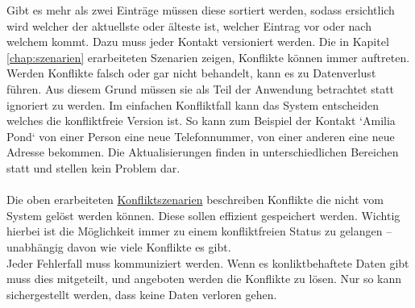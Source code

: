 Gibt es mehr als zwei Einträge müssen diese sortiert werden, sodass ersichtlich wird welcher der aktuellste oder älteste ist, welcher Eintrag vor oder nach welchem kommt. Dazu muss jeder Kontakt versioniert werden.
%
%
Die in Kapitel \ref{chap:szenarien} erarbeiteten Szenarien zeigen, Konflikte können immer auftreten. Werden Konflikte falsch oder gar nicht behandelt, kann es zu Datenverlust führen.
Aus diesem Grund müssen sie als Teil der Anwendung betrachtet statt ignoriert zu werden.
Im einfachen Konfliktfall kann das System entscheiden welches die konfliktfreie Version ist. So kann zum Beispiel der Kontakt `Amilia Pond` von einer Person eine neue Telefonnummer, von einer anderen eine neue Adresse bekommen.
Die Aktualisierungen finden in unterschiedlichen Bereichen statt und stellen kein Problem dar.\\\\
Die oben erarbeiteten \hyperref[sec:konfliktszenarien]{Konfliktszenarien} beschreiben Konflikte die nicht vom System gelöst werden können.
Diese sollen effizient gespeichert werden. Wichtig hierbei ist die Möglichkeit immer zu einem konfliktfreien Status zu gelangen -- unabhängig davon wie viele Konflikte es gibt.\\
Jeder Fehlerfall muss kommuniziert werden. Wenn es konliktbehaftete Daten gibt muss dies mitgeteilt, und angeboten werden die Konflikte zu lösen. Nur so kann sichergestellt werden, dass keine Daten verloren gehen.
